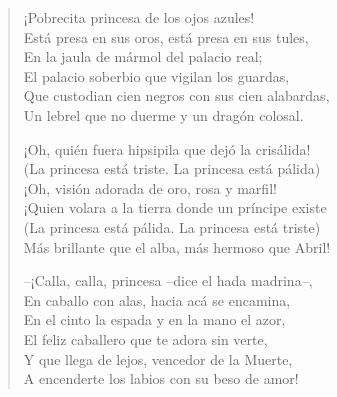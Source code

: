 \documentclass[12pt]{article}
\begin{document}
\begin{verse}
¡Pobrecita princesa de los ojos azules!\\
Está presa en sus oros, está presa en sus tules,\\
En la jaula de mármol del palacio real;\\
El palacio soberbio que vigilan los guardas,\\
Que custodian cien negros con sus cien alabardas,\\
Un lebrel que no duerme y un dragón colosal.  

¡Oh, quién fuera hipsipila que dejó la crisálida!\\
(La princesa está triste. La princesa está pálida)\\
¡Oh, visión adorada de oro, rosa y marfil!\\
¡Quien volara a la tierra donde un príncipe existe\\
(La princesa está pálida. La princesa está triste)\\
Más brillante que el alba, más hermoso que Abril!  

--¡Calla, calla, princesa --dice el hada madrina--,\\
En caballo con alas, hacia acá se encamina,\\
En el cinto la espada y en la mano el azor,\\
El feliz caballero que te adora sin verte,\\
Y que llega de lejos, vencedor de la Muerte,\\
A encenderte los labios con su beso de amor!  

\end{verse}
\end{document}
